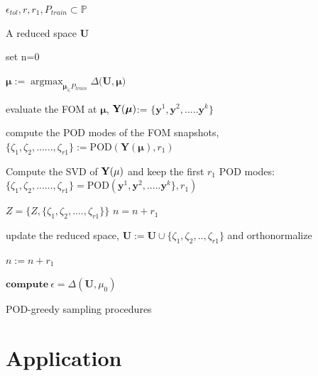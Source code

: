 \documentclass[]{interact}
\DeclareMathOperator{\argmaxH}{argmax}
\theoremstyle{plain}%
\theoremstyle{definition}
\theoremstyle{remark}
\begin{document}
\begin{algorithm}[H]
	
	\begin{algorithmic}
		
		\REQUIRE $\epsilon_{tol}, r, r_1, P_{train} \subset \mathbb P$ 
		
		\ENSURE A reduced space $\textbf{U}$
		
		\STATE set n=0 
		
		
		\STATE $\boldsymbol{\mu} := \argmaxH_{\boldsymbol{\mu}_\in P_{train}} \Delta(\textbf{U}, \boldsymbol{\mu)}$
		
		\STATE evaluate the FOM at $\boldsymbol{\mu}$, $\textbf Y(\boldsymbol{\mu})$:= $\{\textbf{y}^1, \textbf{y}^2, ..... \textbf{y}^k\}$ 
		
		\STATE compute the POD modes of the FOM snapshots, $\{\zeta_1, \zeta_2, ......,\zeta_{r1}\} := \text{POD}(\textbf{Y}(\boldsymbol{\mu}), r_1)$
		
		\STATE Compute the SVD of $\textbf Y(\mu)$ and keep the first $r_1$ POD modes:$\{\zeta_1, \zeta_2, ......,\zeta_{r1}\}= \text{POD}(\textbf{y}^1, \textbf{y}^2, ..... \textbf{y}^k\}, r_1) $
		
		\STATE $Z = \{Z, \{\zeta_1, \zeta_2, ....,\zeta_{r1}\}\}$  $n = n+r_1$
		
		\STATE update the reduced space, $\textbf{U} := \textbf{U} \cup \{\zeta_1, \zeta_2, ..,\zeta_{r1}\} $ and orthonormalize
		
		\STATE $n:=n+r_1$
		
		\STATE $ \textbf{compute} ~\epsilon = \Delta(\textbf{U}, \mu_0)$
		
		\ENDWHILE
		
	\end{algorithmic}
	
	\caption{POD-greedy sampling procedures}
	
	\label{alg:greedy pod}
	
\end{algorithm}

\section{Application}
\end{document}
